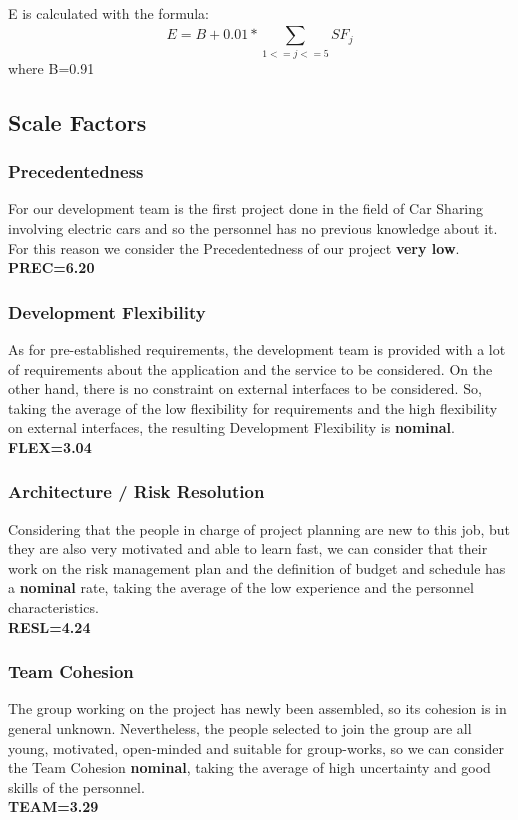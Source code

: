 \begin{itemize}
	E is calculated with the formula:
	\begin{equation}
	E = B + 0.01 * \sum_{1<=j<=5}^{} SF_{j}
	\end{equation}
	where B=0.91
\end{itemize}


\subsection{Scale Factors}
\subsubsection{Precedentedness}
For our development team is the first project done in the field of Car Sharing involving electric cars and so the personnel has no previous knowledge about it. For this reason we consider the Precedentedness of our project \textbf{very low}.\\
\textbf{PREC=6.20}

\subsubsection{Development Flexibility}
As for pre-established requirements, the development team is provided with a lot of requirements about the application and the service to be considered. On the other hand, there is no constraint on external interfaces to be considered.
So, taking the average of the low flexibility for requirements and the high flexibility on external interfaces, the resulting Development Flexibility is \textbf{nominal}.\\
\textbf{FLEX=3.04}

\subsubsection{Architecture / Risk Resolution}
Considering that the people in charge of project planning are new to this job, but they are also very motivated and able to learn fast, we can consider that their work on the risk management plan and the definition of budget and schedule has a \textbf{nominal} rate, taking the average of the low experience and the personnel characteristics.\\
\textbf{RESL=4.24}

\subsubsection{Team Cohesion}
The group working on the project has newly been assembled, so its cohesion is in general unknown. Nevertheless, the people selected to join the group are all young, motivated, open-minded and suitable for group-works, so we can consider the Team Cohesion \textbf{nominal}, taking the average of high uncertainty and good skills of the personnel.\\
\textbf{TEAM=3.29}

